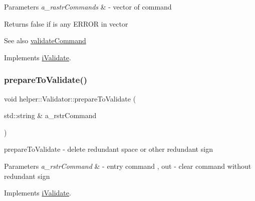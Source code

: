 \begin{DoxyParams}{Parameters}
{\em a\+\_\+rastr\+Commands} & -\/ vector of command \\
\hline
\end{DoxyParams}
\begin{DoxyReturn}{Returns}
false if is any E\+R\+R\+OR in vector 
\end{DoxyReturn}
\begin{DoxySeeAlso}{See also}
\mbox{\hyperlink{classhelper_1_1_validator_aae6518da92c0aa1a982fc3a55ad520fa}{validate\+Command}} 
\end{DoxySeeAlso}


Implements \mbox{\hyperlink{classi_validate}{i\+Validate}}.

\mbox{\label{classhelper_1_1_validator_a29502b3d7fcb861a37428adc53e4808d}} 
\subsubsection{\texorpdfstring{prepareToValidate()}{prepareToValidate()}}
{\footnotesize\ttfamily void helper\+::\+Validator\+::prepare\+To\+Validate (\begin{DoxyParamCaption}\item[{std\+::string \&}]{a\+\_\+rstr\+Command }\end{DoxyParamCaption})\hspace{0.3cm}{\ttfamily [virtual]}}



prepare\+To\+Validate -\/ delete redundant space or other redundant sign 


\begin{DoxyParams}{Parameters}
{\em a\+\_\+rstr\+Command} & -\/ entry command , out -\/ clear command without redundant sign \\
\hline
\end{DoxyParams}


Implements \mbox{\hyperlink{classi_validate}{i\+Validate}}.

\mbox{\label{classhelper_1_1_validator_aae6518da92c0aa1a982fc3a55ad520fa}} 
